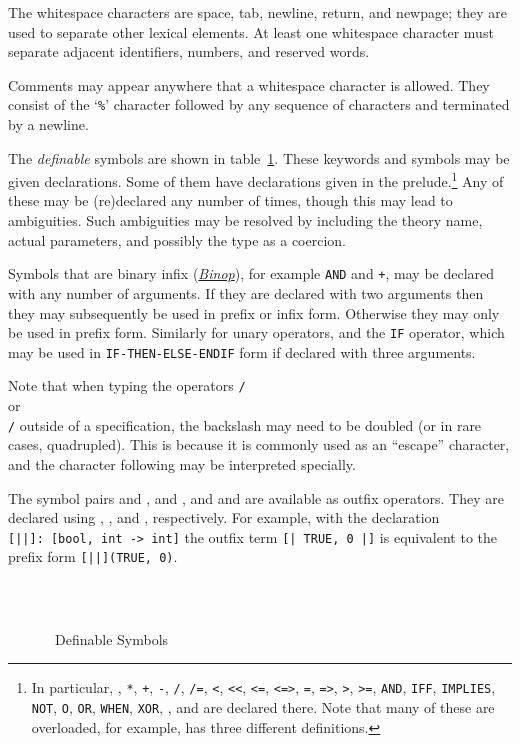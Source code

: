 The whitespace characters are space, tab, newline, return, and newpage;
they are used to separate other lexical elements.  At least one whitespace
character must separate adjacent identifiers, numbers, and reserved words.

Comments may appear anywhere that a whitespace character
is allowed.  They consist of the `\texttt{\%}' character
followed by any sequence of characters and terminated by a newline.

The \emph{definable} symbols are shown in table~\ref{definable-symbols}.
These keywords and symbols may be given declarations.  Some of them have
declarations given in the prelude.\footnote{In particular,
\texttt{}, \texttt{*}, \texttt{+}, \texttt{-}, \texttt{/},
\texttt{/=}, \texttt{<}, \texttt{<<}, \texttt{<=}, \texttt{<=>},
\texttt{=}, \texttt{=>}, \texttt{>}, \texttt{>=}, \texttt{AND},
\texttt{IFF}, \texttt{IMPLIES}, \texttt{NOT}, \texttt{O}, \texttt{OR},
\texttt{WHEN}, \texttt{XOR}, \texttt{}, and \texttt{} are
declared there.  Note that many of these are overloaded, for example,
\texttt{} has three different definitions.}  Any of these may be
(re)declared any number of times, though this may lead to ambiguities.
Such ambiguities may be resolved by including the theory name, actual
parameters,  and possibly the type as a coercion.

Symbols that are binary infix (\hyperlink{Binop}{\emph{Binop}}), for
example \texttt{AND} and \texttt{+}, may be declared with any number of
arguments.  If they are declared with two arguments then they may
subsequently be used in prefix or infix form.  Otherwise they may only be
used in prefix form.  Similarly for unary operators, and the \texttt{IF}
operator, which may be used in \texttt{IF-THEN-ELSE-ENDIF} form if
declared with three arguments.

Note that when typing the operators \texttt{/\\} or \texttt{\\/} outside
of a specification, the backslash may need to be doubled (or in rare
cases, quadrupled).  This is because it is commonly used as an ``escape''
character, and the character following may be interpreted specially.

The symbol pairs \lit{[|} and \lit{|]}, \lit{(|} and \lit{|)}, and
\lit{$\{$|} and \lit{|$\}$} are available as outfix operators.  They are
declared using \lit{[||]}, \lit{(||)}, and \lit{$\{$||$\}$}, respectively.
For example, with the declaration \texttt{[||]:\ [bool, int -> int]} the
outfix term \texttt{[| TRUE, 0 |]} is equivalent to the prefix form
\texttt{[||](TRUE, 0)}.

\begin{figure}[tb]
\begin{center}
{\small\tt
\begin{tabular}{|*{6}{@{\hspace*{.2in}}c@{}}@{\hspace*{.2in}}|}\hline

\hline
\end{tabular}}
\end{center}
\caption{\pvs\ Definable Symbols}\label{definable-symbols}
\end{figure}
